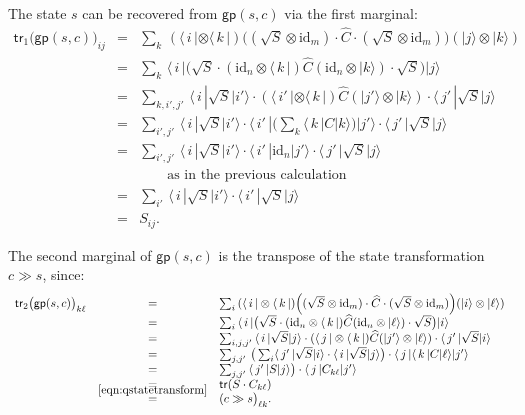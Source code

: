 \documentclass[leqno]{tufte-book} %
\newcommand{\tr}{\mathsf{tr}}
\newcommand{\gp}{\mathsf{gp}}
\newcommand{\ket}[1]{\ensuremath{|#1\rangle}}
\newcommand{\bra}[1]{\langle\,#1\,|}
\newcommand{\idmap}[1][]{\ensuremath{\mathrm{id}_{#1}}}
\begin{document}
{\noindent The state $s$ can be recovered from $\gp(s,c)$ via the
first marginal:
$$\begin{array}{rcl}
\tr_{1}\big(\gp(s,c)\big)_{ij}
& = &
\sum_{k}\, (\bra{i}\otimes\bra{k})\Big((\sqrt{S}\otimes\idmap[m]) \cdot 
   \widehat{C} \cdot (\sqrt{S}\otimes\idmap[m])\Big)(\ket{j}\otimes\ket{k})
\\
& = &
\sum_{k}\, \bra{i}\big(\sqrt{S} \cdot 
   (\idmap[n]\otimes\bra{k})\widehat{C}(\idmap[n]\otimes\ket{k}) 
   \cdot \sqrt{S}\big)\ket{j}
\\
& = &
\sum_{k,i',j'}\, \bra{i}\sqrt{S}\ket{i'} \cdot 
   (\bra{i'}\otimes\bra{k})\widehat{C}(\ket{j'}\otimes\ket{k}) 
   \cdot \bra{j'}\sqrt{S}\ket{j}
\\
& = &
\sum_{i',j'}\, \bra{i}\sqrt{S}\ket{i'} \cdot 
   \bra{i'}(\sum_{k}\bra{k}C\ket{k})\ket{j'} \cdot \bra{j'}\sqrt{S}\ket{j}
\\
& = &
\sum_{i',j'}\, \bra{i}\sqrt{S}\ket{i'} \cdot 
   \bra{i'}\idmap[n]\ket{j'} \cdot \bra{j'}\sqrt{S}\ket{j} 
\\
& & \qquad \mbox{as in the previous calculation}
\\
& = &
\sum_{i'}\, \bra{i}\sqrt{S}\ket{i'} \cdot \bra{i'}\sqrt{S}\ket{j} 
\\
& = &
S_{ij}.
\end{array}$$

\noindent The second marginal of $\gp(s,c)$ is the transpose
of the state transformation $c \gg s$, since:
$$\begin{array}{rcl}
\tr_{2}\big(\gp(s,c)\big)_{k\ell}
& = &
\sum_{i}\, (\bra{i}\otimes\bra{k})\Big((\sqrt{S}\otimes\idmap[m]) \cdot 
   \widehat{C} \cdot (\sqrt{S}\otimes\idmap[m])\Big)(\ket{i}\otimes\ket{\ell})
\\
& = &
\sum_{i}\, \bra{i}\big(\sqrt{S} \cdot 
   (\idmap[n]\otimes\bra{k})\widehat{C}(\idmap[n]\otimes\ket{\ell}) 
   \cdot \sqrt{S}\big)\ket{i}
\\
& = &
\sum_{i,j,j'}\, \bra{i}\sqrt{S}\ket{j} \cdot 
   (\bra{j}\otimes\bra{k})\widehat{C}(\ket{j'}\otimes\ket{\ell}) 
   \cdot \bra{j'}\sqrt{S}\ket{i}
\\
& = &
\sum_{j,j'}\, \big(\sum_{i}\bra{j'}\sqrt{S}\ket{i} \cdot 
   \bra{i}\sqrt{S}\ket{j}\big) \cdot 
   \bra{j}\bra{k}C\ket{\ell}\ket{j'}
\\
& = &
\sum_{j,j'}\, \bra{j'}S\ket{j}\big) \cdot \bra{j}C_{k\ell}\ket{j'}
\\
& = &
\tr(S \cdot C_{k\ell})
\\
& \smash{\stackrel{\eqref{eqn:qstatetransform}}{=}} &
(c \gg s\big)_{\ell k}.
\end{array}$$

}
\end{document}
